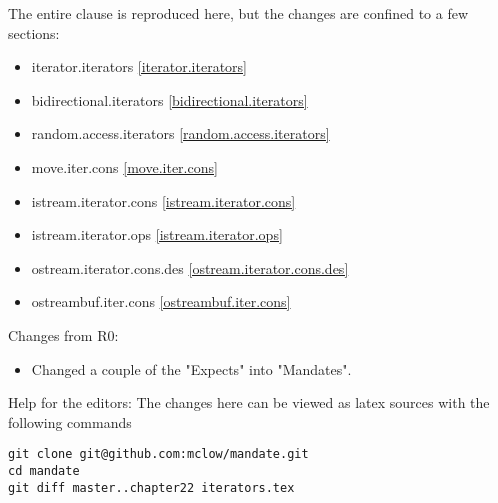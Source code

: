 The entire clause is reproduced here, but the changes are confined to a few sections:

\begin{itemize}
\item{iterator.iterators        \ref{iterator.iterators}}
\item{bidirectional.iterators   \ref{bidirectional.iterators}}
\item{random.access.iterators   \ref{random.access.iterators}}
\item{move.iter.cons            \ref{move.iter.cons}}
\item{istream.iterator.cons     \ref{istream.iterator.cons}}
\item{istream.iterator.ops      \ref{istream.iterator.ops}}
\item{ostream.iterator.cons.des \ref{ostream.iterator.cons.des}}
\item{ostreambuf.iter.cons      \ref{ostreambuf.iter.cons}}
\end{itemize}

Changes from R0:
\begin{itemize}
\item{Changed a couple of the "Expects" into "Mandates".}
\end{itemize}

\vfill
Help for the editors: The changes here can be viewed as latex sources with the following commands
\begin{verbatim}
git clone git@github.com:mclow/mandate.git
cd mandate
git diff master..chapter22 iterators.tex
\end{verbatim}
\newpage
